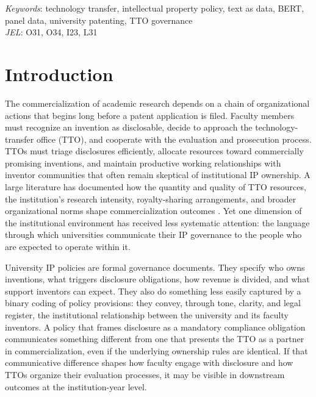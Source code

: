 \documentclass[12pt]{article}
\begin{document}
\begin{titlepage}
\begin{center}
\vspace{0.8cm}
{\small \textit{Keywords}: technology transfer, intellectual property policy,
text as data, BERT, panel data, university patenting, TTO governance}\\[0.3em]
{\small \textit{JEL}: O31, O34, I23, L31}

\end{center}
\end{titlepage}

\section{Introduction}
\label{sec:intro}

The commercialization of academic research depends on a chain of organizational actions
that begins long before a patent application is filed. Faculty members must recognize an
invention as disclosable, decide to approach the technology-transfer office (TTO), and
cooperate with the evaluation and prosecution process. TTOs must triage disclosures
efficiently, allocate resources toward commercially promising inventions, and maintain
productive working relationships with inventor communities that often remain skeptical of
institutional IP ownership. A large literature has documented how the quantity and quality
of TTO resources, the institution's research intensity, royalty-sharing arrangements, and
broader organizational norms shape commercialization outcomes \citep{henderson1998,
mowery2001, thursby2002, thursbythursby2002, siegel2003, siegel2004, dechenaux2011}.
Yet one dimension of the institutional environment has received less systematic attention:
the language through which universities communicate their IP governance to the people who
are expected to operate within it.

University IP policies are formal governance documents. They specify who owns
inventions, what triggers disclosure obligations, how revenue is divided, and what support
inventors can expect. They also do something less easily captured by a binary coding of
policy provisions: they convey, through tone, clarity, and legal register, the institutional
relationship between the university and its faculty inventors. A policy that frames
disclosure as a mandatory compliance obligation communicates something different from one
that presents the TTO as a partner in commercialization, even if the underlying ownership
rules are identical. If that communicative difference shapes how faculty engage with
disclosure and how TTOs organize their evaluation processes, it may be visible in
downstream outcomes at the institution-year level.
\end{document}

